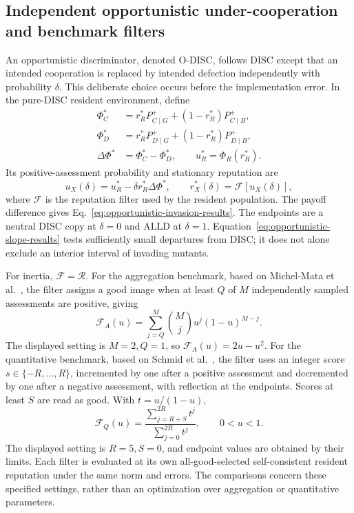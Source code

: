 \documentclass[fleqn,10pt]{article}
\begin{document}
\subsection*{Independent opportunistic under-cooperation and benchmark filters}

An opportunistic discriminator, denoted O-DISC, follows DISC except that an intended cooperation is replaced by intended defection independently with probability $\delta$. This deliberate choice occurs before the implementation error. In the pure-DISC resident environment, define
\begin{equation}
\begin{aligned}
\Phi_C^*&=r_R^*P^+_{C\mid G}+(1-r_R^*)P^+_{C\mid B},\\
\Phi_D^*&=r_R^*P^+_{D\mid G}+(1-r_R^*)P^+_{D\mid B},\\
\Delta\Phi^*&=\Phi_C^*-\Phi_D^*,\qquad
u_R^*=\Phi_R(r_R^*).
\end{aligned}
\label{eq:methods-opportunist-assessment}
\end{equation}
Its positive-assessment probability and stationary reputation are
\begin{equation}
u_X(\delta)=u_R^*-\delta r_R^*\Delta\Phi^*,\qquad
r_X^*(\delta)=\mathcal F[u_X(\delta)],
\label{eq:methods-opportunist-reputation}
\end{equation}
where $\mathcal F$ is the reputation filter used by the resident population. The payoff difference gives Eq.~\eqref{eq:opportunistic-invasion-results}. The endpoints are a neutral DISC copy at $\delta=0$ and ALLD at $\delta=1$. Equation~\eqref{eq:opportunistic-slope-results} tests sufficiently small departures from DISC; it does not alone exclude an interior interval of invading mutants.

For inertia, $\mathcal F=\mathcal R$. For the aggregation benchmark, based on Michel-Mata et al.~\cite{michelmata2024}, the filter assigns a good image when at least $Q$ of $M$ independently sampled assessments are positive, giving
\begin{equation}
\mathcal F_A(u)=\sum_{j=Q}^{M}\binom Mj u^j(1-u)^{M-j}.
\label{eq:methods-aggregation-filter}
\end{equation}
The displayed setting is $M=2,Q=1$, so $\mathcal F_A(u)=2u-u^2$. For the quantitative benchmark, based on Schmid et al.~\cite{schmid2023}, the filter uses an integer score $s\in\{-R,\ldots,R\}$, incremented by one after a positive assessment and decremented by one after a negative assessment, with reflection at the endpoints. Scores at least $S$ are read as good. With $t=u/(1-u)$,
\begin{equation}
\mathcal F_Q(u)=\frac{\sum_{j=R+S}^{2R}t^j}{\sum_{j=0}^{2R}t^j},
\qquad 0<u<1.
\label{eq:methods-quantitative-filter}
\end{equation}
The displayed setting is $R=5,S=0$, and endpoint values are obtained by their limits. Each filter is evaluated at its own all-good-selected self-consistent resident reputation under the same norm and errors. The comparisons concern these specified settings, rather than an optimization over aggregation or quantitative parameters.
\end{document}
